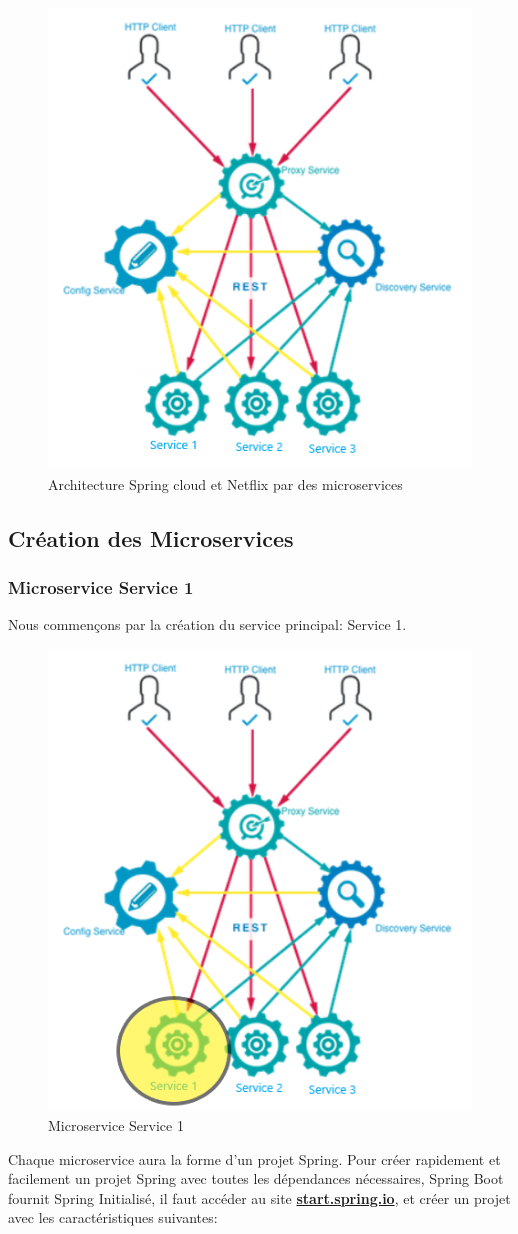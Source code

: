 \begin{figure}[H]
	\centering
	\includegraphics[width=0.5\linewidth]{images/tp01}
	\caption{Architecture Spring cloud et Netflix  par des microservices}
	\label{fig:tp01}
\end{figure}


\subsection{Création des Microservices}
\subsubsection{Microservice  Service 1}
Nous commençons par la création du service principal: Service 1.

\begin{figure}[H]
	\centering
	\includegraphics[width=0.5\linewidth]{images/tp02}
	\caption{Microservice  Service 1}
	\label{fig:tp02}
\end{figure}


Chaque microservice aura la forme d'un projet Spring. Pour créer rapidement et facilement un projet Spring avec toutes les dépendances nécessaires, Spring Boot fournit Spring Initialisé, il faut accéder  au site \underline{\textbf{start.spring.io}}, et créer un projet avec les caractéristiques suivantes:

